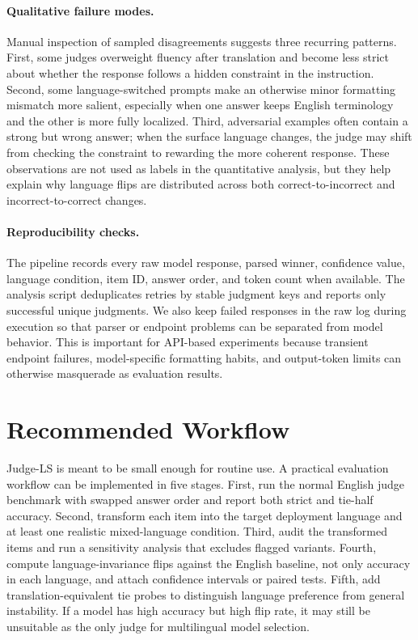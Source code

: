 \documentclass[10pt,twocolumn]{article}
\begin{document}
\paragraph{Qualitative failure modes.}
Manual inspection of sampled disagreements suggests three recurring patterns. First, some judges overweight fluency after translation and become less strict about whether the response follows a hidden constraint in the instruction. Second, some language-switched prompts make an otherwise minor formatting mismatch more salient, especially when one answer keeps English terminology and the other is more fully localized. Third, adversarial examples often contain a strong but wrong answer; when the surface language changes, the judge may shift from checking the constraint to rewarding the more coherent response. These observations are not used as labels in the quantitative analysis, but they help explain why language flips are distributed across both correct-to-incorrect and incorrect-to-correct changes.

\paragraph{Reproducibility checks.}
The pipeline records every raw model response, parsed winner, confidence value, language condition, item ID, answer order, and token count when available. The analysis script deduplicates retries by stable judgment keys and reports only successful unique judgments. We also keep failed responses in the raw log during execution so that parser or endpoint problems can be separated from model behavior. This is important for API-based experiments because transient endpoint failures, model-specific formatting habits, and output-token limits can otherwise masquerade as evaluation results.

\section{Recommended Workflow}

Judge-LS is meant to be small enough for routine use. A practical evaluation workflow can be implemented in five stages. First, run the normal English judge benchmark with swapped answer order and report both strict and tie-half accuracy. Second, transform each item into the target deployment language and at least one realistic mixed-language condition. Third, audit the transformed items and run a sensitivity analysis that excludes flagged variants. Fourth, compute language-invariance flips against the English baseline, not only accuracy in each language, and attach confidence intervals or paired tests. Fifth, add translation-equivalent tie probes to distinguish language preference from general instability. If a model has high accuracy but high flip rate, it may still be unsuitable as the only judge for multilingual model selection.
\end{document}
